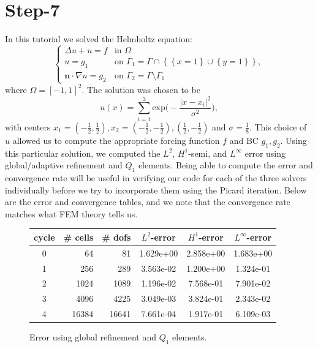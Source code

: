 \documentclass[11pt,fullpage]{article}
\newcommand{\abs}[1]{\left\vert#1\right\vert}
\newcommand{\set}[1]{\left\{#1\right\}}
\newcommand{\grad}{\nabla}
\theoremstyle{lemma}
\theoremstyle{definition}
\theoremstyle{lemma}
\begin{document}
\section*{Step-7}
In this tutorial we solved the Helmholtz equation:
$$
\begin{cases}
\Delta u + u = f &\text{in }\Omega\\
u = g_1 & \text{on }\Gamma_1 = \Gamma \cap \set{\set{x=1}\cup\set{y=1}},\\
\mathbf{n}\cdot \grad u = g_2 & \text{on }\Gamma_2 = \Gamma\setminus \Gamma_1
\end{cases}
$$
where $\Omega = [-1,1]^2$. The solution was chosen to be
$$
u(x) = \sum_{i=1}^3 \text{exp}\bigg(-\frac{\abs{x-x_i}^2}{\sigma^2}\bigg),
$$
with centers $x_1 = (-\frac{1}{2}, \frac{1}{2}), x_2=(-\frac{1}{2}, -\frac{1}{2}),(\frac{1}{2}, -\frac{1}{2})$ and $\sigma = \frac{1}{8}$. This choice of $u$ allowed us to compute the appropriate forcing function $f$ and BC $g_1, g_2$. Using this particular solution, we computed the $L^2$, $H^1$-semi, and $L^\infty$ error using global/adaptive refinement and $Q_1$ elements. Being able to compute the error and convergence rate will be useful in verifying our code for each of the three solvers individually before we try to incorporate them using the Picard iteration. Below are the error and convergence tables, and we note that the convergence rate matches what FEM theory tells us.

\begin{figure}[!ht]
	\centering
	\begin{tabular}{|c|r|r|c|c|c|} \hline
		cycle & \# cells & \# dofs & $L^2$-error & $H^1$-error &$L^\infty$-error\\ \hline
		0 & 64 & 81 & 1.629e+00 & 2.858e+00 & 1.683e+00\\ \hline
		1 & 256 & 289 & 3.563e-02 & 1.200e+00 & 1.324e-01\\ \hline
		2 & 1024 & 1089 & 1.196e-02 & 7.568e-01 & 7.901e-02\\ \hline
		3 & 4096 & 4225 & 3.049e-03 & 3.824e-01 & 2.343e-02\\ \hline
		4 & 16384 & 16641 & 7.661e-04 & 1.917e-01 & 6.109e-03\\ \hline
	\end{tabular}
	\caption{Error using global refinement and $Q_1$ elements.}
\end{figure}
\end{document}
